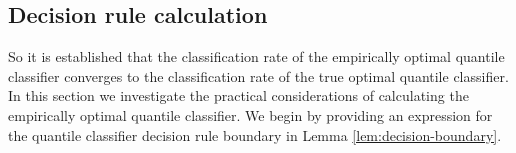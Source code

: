 



\subsection{Decision rule calculation}
\label{sec:empirical-quantile-classifier-results}

So it is established that the classification rate of the empirically optimal
quantile classifier converges to the classification rate of the true optimal
quantile classifier.  In this section we investigate the practical
considerations of calculating the empirically optimal quantile classifier.  We
begin by providing an expression for the quantile classifier decision rule
boundary in Lemma \ref{lem:decision-boundary}.

